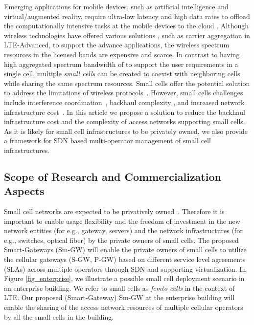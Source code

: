 \documentclass[journal,twoside,comsoc]{IEEEtran}
\begin{document}
Emerging applications for
mobile devices, such as artificial
intelligence and virtual/augmented reality,
require ultra-low latency and high data rates
to offload the computationally intensive tasks at the mobile devices
to the cloud \cite{Qixuan2015}.
Although wireless technologies
have offered various solutions \cite{ZukangShen2012}, such as
carrier aggregation in LTE-Advanced,
to support the advance applications, the
wireless spectrum resources in the licensed bands are
expensive and scarce.
In contrast to having high aggregated spectrum bandwidth of
to support the user requirements in a single cell,
multiple \textit{small cells} can be created to coexist with
neighboring cells while
sharing the same spectrum resources.
Small cells offer the
potential solution to address the limitations of wireless
protocols~\cite{Bjerke2011,Nakamura2013,Alsohaily2013,Wei2013, Mahmood2015}.
However, small cells challenges include
interference coordination~\cite{Cong2014},
backhaul complexity \cite{Siddique2015,wan2015bac}, and increased network
infrastructure cost~\cite{Mugume2015}.
In this article we propose a solution to
reduce the backhaul infrastructure cost and the complexity of access
networks supporting small cells. As it is likely for small cell 
infrastructures to be privately owned, we also provide a framework
for SDN based multi-operator management of small cell infrastructures.


\subsection{Scope of Research and Commercialization Aspects}

Small cell networks are expected to be privatively owned~\cite{Limbach2013}.
Therefore it is important
to enable usage flexibility and the freedom of investment in the new
network entities
(for e.g., gateway, servers) and the network infrastructures
(for e.g., switches, optical fiber)
by the private owners of small cells. The proposed Smart-Gateways (Sm-GW)
will enable the
private owners of small cells to utilize the cellular gateways
(S-GW, P-GW) based
on different service level agreements (SLAs) across multiple operators
through SDN and supporting virtualization. In Figure \ref{fig_enterprise}, we illustrate
a possible small cell deployment scenario in an enterprise building.
We refer to small cells as \textit{femto cells} in the context of LTE.
Our proposed (Smart-Gateway) Sm-GW at the enterprise building
will enable the sharing of the access network resources
of multiple cellular operators by all the small cells in the building. 
\end{document}
